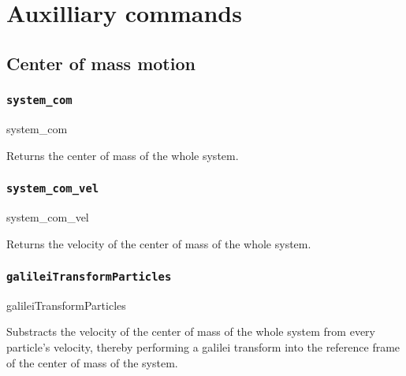 %  
%   
%  
%  
%
\chapter{Auxilliary commands}
\label{chap:aux}


\section{Center of mass motion}
\label{sec:centerofmassmotion}

\subsection{\texttt{system_com}}
\begin{essyntax}
  system_com
\end{essyntax}
Returns the center of mass of the whole system.

\subsection{\texttt{system_com_vel}}
\begin{essyntax}
  system_com_vel
\end{essyntax}
Returns the velocity of the center of mass of the whole system.

\subsection{\texttt{galileiTransformParticles}}
\begin{essyntax}
  galileiTransformParticles
\end{essyntax}
Substracts the velocity of the center of mass of the whole system from every 
particle's velocity, thereby performing a galilei transform into the reference 
frame of the center of mass of the system.

